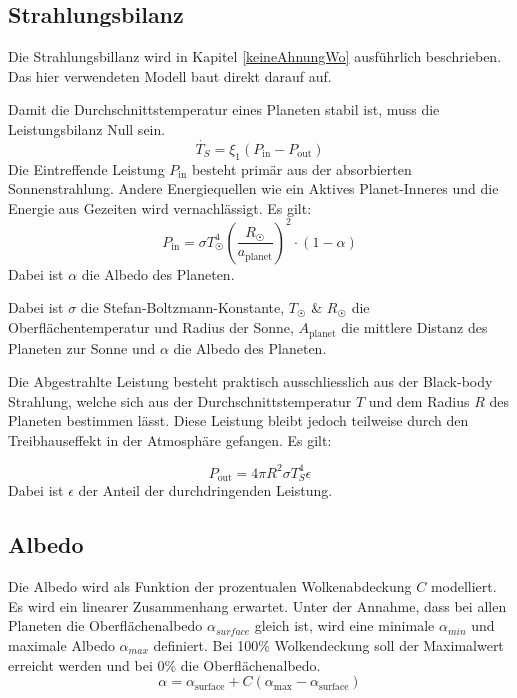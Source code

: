 \begin{refsection}
\subsection{Strahlungsbilanz}
Die Strahlungsbillanz wird in Kapitel \ref{keineAhnungWo} ausführlich beschrieben. Das hier verwendeten Modell baut direkt darauf auf.

Damit die Durchschnittstemperatur eines Planeten stabil ist, muss die Leistungsbilanz Null sein.
\begin{equation}
\dot{T_S} = \xi_1(P_{\text{in}} - P_{\text{out}})
\end{equation}
Die Eintreffende Leistung $P_{\text{in}}$ besteht primär aus der absorbierten Sonnenstrahlung. Andere Energiequellen wie ein Aktives Planet-Inneres und die Energie aus Gezeiten wird vernachlässigt. Es gilt:
\begin{equation}
P_{\text{in}} = \sigma T_{\astrosun}^4 \left( \frac{R_{\astrosun}}{a_{\text{planet}}} \right) ^2 \cdot (1-\alpha)
\end{equation}
Dabei ist $\alpha$ die Albedo des Planeten.

Dabei ist $\sigma$ die Stefan-Boltzmann-Konstante, $T_{\astrosun}$ \& $R_{\astrosun}$ die Oberflächentemperatur und Radius der Sonne, $ A_{\text{planet}}$ die mittlere Distanz des Planeten zur Sonne und $\alpha$ die Albedo des Planeten.

Die Abgestrahlte Leistung besteht praktisch ausschliesslich aus der Black-body Strahlung, welche sich aus der Durchschnittstemperatur $T$ und dem Radius $R$ des Planeten bestimmen lässt. Diese Leistung bleibt jedoch teilweise durch den Treibhauseffekt in der Atmosphäre gefangen. Es gilt: 

\begin{equation}
P_{\text{out}} = 4 \pi R^2 \sigma T_{S}^4 \epsilon
\end{equation}
Dabei ist $\epsilon$ der Anteil der durchdringenden Leistung.



\subsection{Albedo}

Die Albedo wird als Funktion der prozentualen Wolkenabdeckung $C$ modelliert. Es wird ein linearer Zusammenhang erwartet. Unter der Annahme, dass bei allen Planeten die Oberflächenalbedo $\alpha_{surface}$ gleich ist, wird eine minimale $\alpha_{min}$ und maximale Albedo $\alpha_{max}$ definiert. Bei 100\% Wolkendeckung soll der Maximalwert erreicht werden und bei 0\% die Oberflächenalbedo.
\begin{equation}
\alpha = \alpha_{\text{surface}} + C(\alpha_{\text{max}} - \alpha_{\text{surface}})
\end{equation}


\end{refsection}
